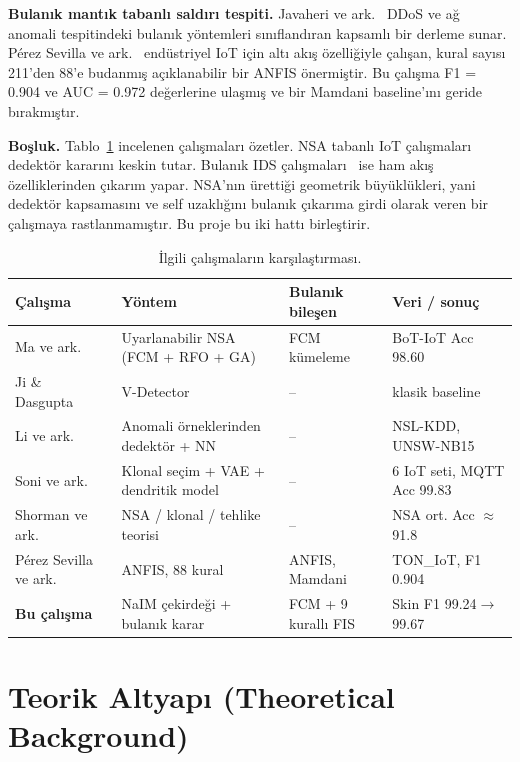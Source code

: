 \documentclass[11pt,a4paper]{article}
\begin{document}
\textbf{Bulanık mantık tabanlı saldırı tespiti.} Javaheri ve ark.~\cite{javaheri2023} DDoS ve ağ anomali tespitindeki bulanık yöntemleri sınıflandıran kapsamlı bir derleme sunar. Pérez Sevilla ve ark.~\cite{perez2026} endüstriyel IoT için altı akış özelliğiyle çalışan, kural sayısı 211'den 88'e budanmış açıklanabilir bir ANFIS önermiştir. Bu çalışma F1 = 0.904 ve AUC = 0.972 değerlerine ulaşmış ve bir Mamdani baseline'ını geride bırakmıştır.

\textbf{Boşluk.} Tablo~\ref{tab:lit} incelenen çalışmaları özetler. NSA tabanlı IoT çalışmaları~\cite{ma2024,he2021,li2025,soni2025,shorman2025} dedektör kararını keskin tutar. Bulanık IDS çalışmaları~\cite{javaheri2023,perez2026} ise ham akış özelliklerinden çıkarım yapar. NSA'nın ürettiği geometrik büyüklükleri, yani dedektör kapsamasını ve self uzaklığını bulanık çıkarıma girdi olarak veren bir çalışmaya rastlanmamıştır. Bu proje bu iki hattı birleştirir.

\begin{table}[H]
\centering\small
\caption{İlgili çalışmaların karşılaştırması.}\label{tab:lit}
\begin{tabularx}{\textwidth}{@{}lXlX@{}}
\toprule
Çalışma & Yöntem & Bulanık bileşen & Veri / sonuç \\
\midrule
Ma ve ark.~\cite{ma2024} & Uyarlanabilir NSA (FCM + RFO + GA) & FCM kümeleme & BoT-IoT Acc 98.60 \\
Ji \& Dasgupta~\cite{ji2004} & V-Detector & -- & klasik baseline \\
Li ve ark.~\cite{li2025} & Anomali örneklerinden dedektör + NN & -- & NSL-KDD, UNSW-NB15 \\
Soni ve ark.~\cite{soni2025} & Klonal seçim + VAE + dendritik model & -- & 6 IoT seti, MQTT Acc 99.83 \\
Shorman ve ark.~\cite{shorman2025} & NSA / klonal / tehlike teorisi & -- & NSA ort. Acc $\approx$91.8 \\
Pérez Sevilla ve ark.~\cite{perez2026} & ANFIS, 88 kural & ANFIS, Mamdani & TON\_IoT, F1 0.904 \\
\textbf{Bu çalışma} & NaIM çekirdeği + bulanık karar & FCM + 9 kurallı FIS & Skin F1 99.24$\to$99.67 \\
\bottomrule
\end{tabularx}
\end{table}

\section{Teorik Altyapı (Theoretical Background)}
\end{document}
